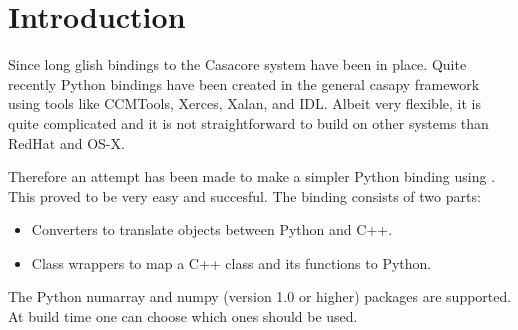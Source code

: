 

\section{Introduction}
Since long glish bindings to the Casacore system have been in
place. Quite recently Python bindings have been created in the general
casapy framework using tools like CCMTools, Xerces, Xalan, and
IDL. Albeit very flexible, it is quite complicated and it is not
straightforward to build on other systems than RedHat and OS-X.

Therefore an attempt has been made to make a simpler Python binding
using .
This proved to be very easy and succesful.
The binding consists of two parts:
\begin{itemize}
\item Converters to translate objects between Python and C++.
\item Class wrappers to map a C++ class and its functions to Python.
\end{itemize}
The Python numarray and numpy (version 1.0 or higher) packages are
supported. At build time one can choose which ones should be used.

